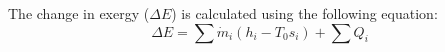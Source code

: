 The change in exergy (\( \Delta E \)) is calculated using the following equation:  
\[
\Delta E = \sum \dot{m}_i \left( h_i - T_0 s_i \right) + \sum Q_i
\]